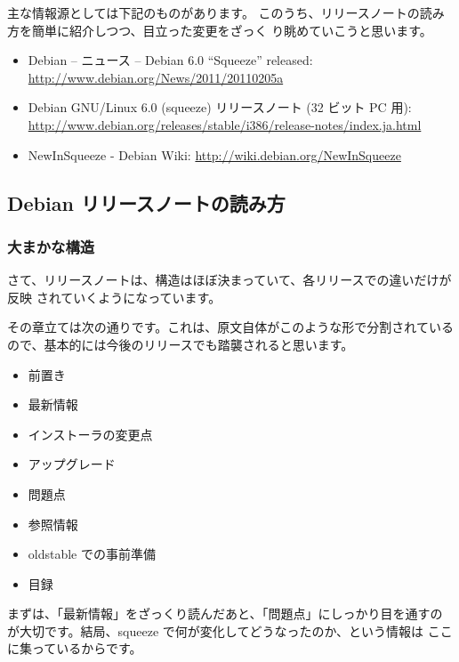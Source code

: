 \documentclass[mingoth,a4paper]{jsarticle}
\begin{document}
主な情報源としては下記のものがあります。
このうち、リリースノートの読み方を簡単に紹介しつつ、目立った変更をざっく
り眺めていこうと思います。

\begin{itemize}
 \item Debian -- ニュース -- Debian 6.0 ``Squeeze'' released:
       \url{http://www.debian.org/News/2011/20110205a}
 \item Debian GNU/Linux 6.0 (squeeze) リリースノート (32 ビット PC 用):
       \url{http://www.debian.org/releases/stable/i386/release-notes/index.ja.html}
 \item NewInSqueeze - Debian Wiki: \url{http://wiki.debian.org/NewInSqueeze}
\end{itemize}

\subsection{Debian リリースノートの読み方}


\subsubsection{大まかな構造}

さて、リリースノートは、構造はほぼ決まっていて、各リリースでの違いだけが反映
されていくようになっています。

その章立ては次の通りです。これは、原文自体がこのような形で分割されている
ので、基本的には今後のリリースでも踏襲されると思います。

\begin{multicols}{2}
 \begin{itemize}
 \item 前置き
 \item 最新情報
 \item インストーラの変更点
 \item アップグレード
 \item 問題点
 \item 参照情報
 \item oldstable での事前準備
 \item 目録
 \end{itemize}
\end{multicols}

まずは、「最新情報」をざっくり読んだあと、「問題点」にしっかり目を通すの
が大切です。結局、squeeze で何が変化してどうなったのか、という情報は
ここに集っているからです。
\end{document}
